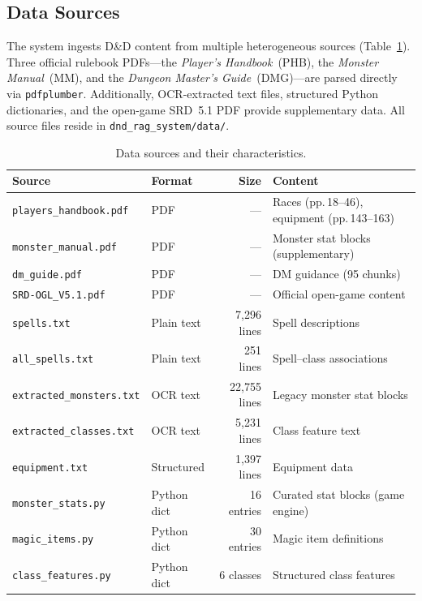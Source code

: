 \documentclass[12pt,a4paper]{article}
\begin{document}
\subsection{Data Sources}

The system ingests D\&D content from multiple heterogeneous sources
(Table~\ref{tab:datasources}). Three official rulebook PDFs---the
\emph{Player's Handbook}~(PHB), the \emph{Monster Manual}~(MM), and the
\emph{Dungeon Master's Guide}~(DMG)---are parsed directly via
\texttt{pdfplumber}. Additionally, OCR-extracted text files, structured
Python dictionaries, and the open-game SRD~5.1 PDF provide supplementary
data. All source files reside in \texttt{dnd\_rag\_system/data/}.

\begin{table}[H]
\centering
\caption{Data sources and their characteristics.}
\label{tab:datasources}
\small
\begin{tabular}{llrl}
\toprule
\textbf{Source} & \textbf{Format} & \textbf{Size} & \textbf{Content} \\
\midrule
\texttt{players\_handbook.pdf}  & PDF          & ---           & Races (pp.\,18--46), equipment (pp.\,143--163) \\
\texttt{monster\_manual.pdf}    & PDF          & ---           & Monster stat blocks (supplementary) \\
\texttt{dm\_guide.pdf}          & PDF          & ---           & DM guidance (95 chunks) \\
\texttt{SRD-OGL\_V5.1.pdf}     & PDF          & ---           & Official open-game content \\
\texttt{spells.txt}             & Plain text   & 7,296 lines  & Spell descriptions \\
\texttt{all\_spells.txt}        & Plain text   & 251 lines    & Spell--class associations \\
\texttt{extracted\_monsters.txt}& OCR text     & 22,755 lines & Legacy monster stat blocks \\
\texttt{extracted\_classes.txt} & OCR text     & 5,231 lines  & Class feature text \\
\texttt{equipment.txt}          & Structured   & 1,397 lines  & Equipment data \\
\texttt{monster\_stats.py}      & Python dict  & 16 entries   & Curated stat blocks (game engine) \\
\texttt{magic\_items.py}        & Python dict  & 30 entries   & Magic item definitions \\
\texttt{class\_features.py}     & Python dict  & 6 classes    & Structured class features \\
\bottomrule
\end{tabular}
\end{table}
\end{document}
